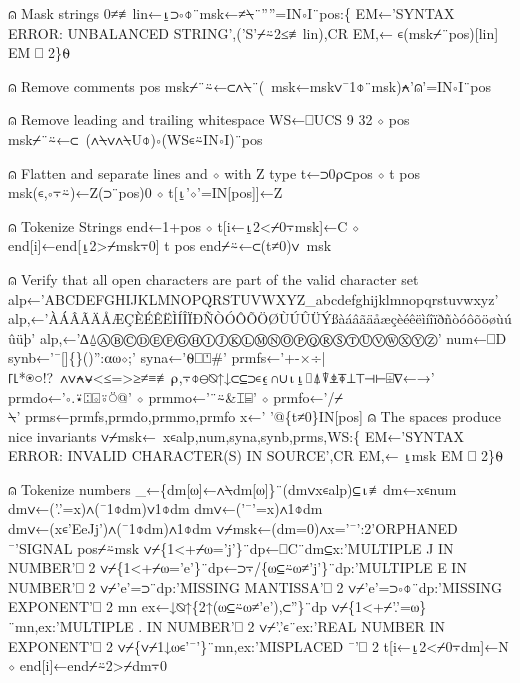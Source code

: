 \documentclass{article}%
\begin{document}
⍝ Mask strings
         0≠≢lin←⍸⊃∘⌽¨msk←≠⍀¨''''=IN∘I¨pos:\{
                 EM←'SYNTAX ERROR: UNBALANCED STRING',('S'⌿⍨2≤≢lin),CR
                 EM,← ∊(msk⌿¨pos)[lin]
                 EM ⎕ 2\}⍬

⍝ Remove comments
         pos msk⌿¨⍨←⊂∧⍀¨(~msk←msk∨¯1⌽¨msk)⍲'⍝'=IN∘I¨pos

⍝ Remove leading and trailing whitespace
         WS←⎕UCS 9 32 ⋄ pos msk⌿¨⍨←⊂~(∧⍀∨∧⍀U⌽)∘(WS∊⍨IN∘I)¨pos

⍝ Flatten and separate lines and ⋄ with Z type
         t←⊃0⍴⊂pos ⋄ t pos msk(∊,∘⍪⍨)←Z(⊃¨pos)0 ⋄ t[⍸'⋄'=IN[pos]]←Z

⍝ Tokenize Strings
         end←1+pos ⋄ t[i←⍸2<⌿0⍪msk]←C ⋄ end[i]←end[⍸2>⌿msk⍪0]
         t pos end⌿⍨←⊂(t≠0)∨~msk

⍝ Verify that all open characters are part of the valid character set
         alp←'ABCDEFGHIJKLMNOPQRSTUVWXYZ_abcdefghijklmnopqrstuvwxyz'
         alp,←'ÀÁÂÃÄÅÆÇÈÉÊËÌÍÎÏÐÑÒÓÔÕÖØÙÚÛÜÝßàáâãäåæçèéêëìíîïðñòóôõöøùúûüþ'
         alp,←'∆⍙ⒶⒷⒸⒹⒺⒻⒼⒽⒾⒿⓀⓁⓂⓃⓄⓅⓆⓇⓈⓉⓊⓋⓌⓍⓎⓏ'
         num←⎕D
         synb←'¯[]\{\}()'':⍺⍵⋄;'
         syna←'⍬⎕⍞#'
         prmfs←'+-×÷|⌈⌊*⍟○!?~∧∨⍲⍱<≤=>≥≠≡≢⍴,⍪⌽⊖⍉↑↓⊂⊆⊃∊⍷∩∪⍳⍸⌷⍋⍒⍎⍕⊥⊤⊣⊢⌹∇←→'
         prmdo←'∘.⍣⍠⌺⍤⍥@' ⋄ prmmo←'¨⍨&⌶⌸' ⋄ prmfo←'/⌿\\⍀'
         prms←prmfs,prmdo,prmmo,prmfo
         x←' '@\{t≠0\}IN[pos] ⍝ The spaces produce nice invariants
         ∨⌿msk←~x∊alp,num,syna,synb,prms,WS:\{
                 EM←'SYNTAX ERROR: INVALID CHARACTER(S) IN SOURCE',CR
                 EM,← ⍸msk
                 EM ⎕ 2\}⍬

⍝ Tokenize numbers
         _←\{dm[⍵]←∧⍀dm[⍵]\}¨(dm∨x∊alp)⊆⍳≢dm←x∊num
         dm∨←('.'=x)∧(¯1⌽dm)∨1⌽dm
         dm∨←('¯'=x)∧1⌽dm
         dm∨←(x∊'EeJj')∧(¯1⌽dm)∧1⌽dm
         ∨⌿msk←(dm=0)∧x='¯':2'ORPHANED ¯'SIGNAL pos⌿⍨msk
         ∨⌿\{1<+⌿⍵='j'\}¨dp←⎕C¨dm⊆x:'MULTIPLE J IN NUMBER'⎕ 2
         ∨⌿\{1<+⌿⍵='e'\}¨dp←⊃⍪/\{⍵⊆⍨⍵≠'j'\}¨dp:'MULTIPLE E IN NUMBER'⎕ 2
         ∨⌿'e'=⊃¨dp:'MISSING MANTISSA'⎕ 2
         ∨⌿'e'=⊃∘⌽¨dp:'MISSING EXPONENT'⎕ 2
         mn ex←↓⍉↑\{2↑(⍵⊆⍨⍵≠'e'),⊂''\}¨dp
         ∨⌿\{1<+⌿'.'=⍵\}¨mn,ex:'MULTIPLE . IN NUMBER'⎕ 2
         ∨⌿'.'∊¨ex:'REAL NUMBER IN EXPONENT'⎕ 2
         ∨⌿\{∨⌿1↓⍵∊'¯'\}¨mn,ex:'MISPLACED ¯'⎕ 2
         t[i←⍸2<⌿0⍪dm]←N ⋄ end[i]←end⌿⍨2>⌿dm⍪0
\end{document}
